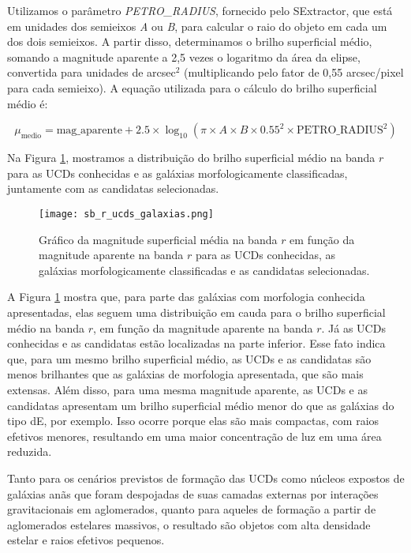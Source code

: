 Utilizamos o parâmetro \textit{PETRO\_RADIUS}, fornecido pelo SExtractor, que está em unidades dos semieixos \textit{A} ou \textit{B}, para calcular o raio do objeto em cada um dos dois semieixos. A partir disso, determinamos o brilho superficial médio, somando a magnitude aparente a 2,5 vezes o logaritmo da área da elipse, convertida para unidades de arcsec$^2$ (multiplicando pelo fator de 0,55 arcsec/pixel para cada semieixo). A equação utilizada para o cálculo do brilho superficial médio é:

\begin{equation}
    \mu_{\text{medio}} = \text{mag\_aparente} + 2.5 \times \log_{10}(\pi \times A \times B \times 0.55^2 \times \text{PETRO\_RADIUS}^2)
    \label{equation_sb}
\end{equation}

Na Figura \ref{sb_r_ucds_galaxias}, mostramos a distribuição do brilho superficial médio na banda $r$ para as UCDs conhecidas e as galáxias morfologicamente classificadas, juntamente com as candidatas selecionadas.

\begin{figure}[!ht]
    \begin{center}
    \texttt{[image: sb\_r\_ucds\_galaxias.png]}
    \caption[]{Gráfico da magnitude superficial média na banda $r$ em função da magnitude aparente na banda $r$ para as UCDs conhecidas, as galáxias morfologicamente classificadas e as candidatas selecionadas.}
    \label{sb_r_ucds_galaxias}
    \end{center}
\end{figure}

A Figura \ref{sb_r_ucds_galaxias} mostra que, para parte das galáxias com morfologia conhecida apresentadas, elas seguem uma distribuição em cauda para o brilho superficial médio na banda $r$, em função da magnitude aparente na banda $r$. Já as UCDs conhecidas e as candidatas estão localizadas na parte inferior. Esse fato indica que, para um mesmo brilho superficial médio, as UCDs e as candidatas são menos brilhantes que as galáxias de morfologia apresentada, que são mais extensas. Além disso, para uma mesma magnitude aparente, as UCDs e as candidatas apresentam um brilho superficial médio menor do que as galáxias do tipo dE, por exemplo. Isso ocorre porque elas são mais compactas, com raios efetivos menores, resultando em uma maior concentração de luz em uma área reduzida.

Tanto para os cenários previstos de formação das UCDs como núcleos expostos de galáxias anãs que foram despojadas de suas camadas externas por interações gravitacionais em aglomerados, quanto para aqueles de formação a partir de aglomerados estelares massivos, o resultado são objetos com alta densidade estelar e raios efetivos pequenos.

